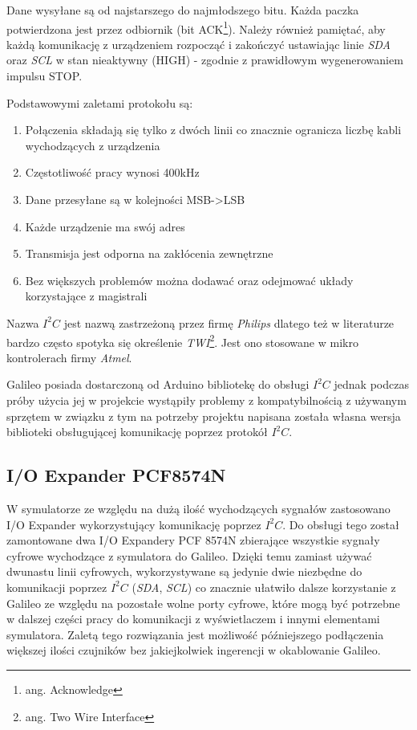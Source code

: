 \documentclass{xmgr}
\begin{document}
Dane wysyłane są od najstarszego do najmłodszego bitu. Każda paczka potwierdzona jest przez odbiornik (bit ACK\footnote{ang. Acknowledge}). Należy również pamiętać, aby każdą komunikację z urządzeniem rozpocząć i zakończyć ustawiając linie \emph{SDA} oraz \emph{SCL} w stan nieaktywny (HIGH) - zgodnie z prawidłowym wygenerowaniem impulsu STOP.

Podstawowymi zaletami protokołu są:
\begin{enumerate}
	\item Połączenia składają się tylko z dwóch linii co znacznie ogranicza liczbę kabli wychodzących z urządzenia
	\item Częstotliwość pracy wynosi 400kHz
	\item Dane przesyłane są w kolejności MSB->LSB
	\item Każde urządzenie ma swój adres	
	\item Transmisja jest odporna na zakłócenia zewnętrzne
	\item Bez większych problemów można dodawać oraz odejmować układy korzystające z magistrali
\end{enumerate}

Nazwa $I^2C$ jest nazwą zastrzeżoną przez firmę \emph{Philips} dlatego też w literaturze bardzo często spotyka się określenie \emph{TWI}\footnote{ang. Two Wire Interface}. Jest ono stosowane w mikro kontrolerach firmy \emph{Atmel}. 

Galileo posiada dostarczoną od Arduino bibliotekę do obsługi $I^2C$ jednak podczas próby użycia jej w projekcie wystąpiły problemy z kompatybilnością z używanym sprzętem w związku z tym na potrzeby projektu napisana została własna wersja biblioteki obsługującej komunikację poprzez protokół $I^2C$.

\subsection{I/O Expander PCF8574N}
W symulatorze ze względu na dużą ilość wychodzących sygnałów zastosowano I/O Expander wykorzystujący komunikację poprzez $I^2C$. Do obsługi tego został zamontowane dwa I/O Expandery PCF 8574N zbierające wszystkie sygnały cyfrowe wychodzące z symulatora do Galileo. Dzięki temu zamiast używać dwunastu linii cyfrowych, wykorzystywane są jedynie dwie niezbędne do komunikacji poprzez $I^2C$ (\emph{SDA}, \emph{SCL}) co znacznie ułatwiło dalsze korzystanie z Galileo ze względu na pozostałe wolne porty cyfrowe, które mogą być potrzebne w dalszej części pracy do komunikacji z wyświetlaczem i innymi elementami symulatora. Zaletą tego rozwiązania jest możliwość późniejszego podłączenia większej ilości czujników bez jakiejkolwiek ingerencji w okablowanie Galileo.
\end{document}
